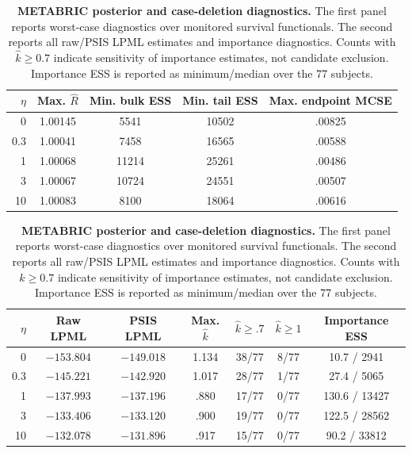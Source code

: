 \documentclass{article} %
\begin{document}
\begin{table}[htbp]
\centering\footnotesize
\caption{\textbf{METABRIC posterior and case-deletion diagnostics.} The first panel reports worst-case diagnostics over monitored survival functionals. The second reports all raw/PSIS LPML estimates and importance diagnostics. Counts with $\widehat k\geq0.7$ indicate sensitivity of importance estimates, not candidate exclusion. Importance ESS is reported as minimum/median over the 77 subjects.}
\label{tab:real-cpo-diagnostics}
\setlength{\tabcolsep}{5pt}
\begin{tabular}{@{}rcccc@{}}
\toprule
$\eta$ & Max. $\widehat R$ & Min. bulk ESS & Min. tail ESS & Max. endpoint MCSE\\
\midrule
0 & 1.00145 & 5541 & 10502 & .00825\\
0.3 & 1.00041 & 7458 & 16565 & .00588\\
1 & 1.00068 & 11214 & 25261 & .00486\\
3 & 1.00067 & 10724 & 24551 & .00507\\
10 & 1.00083 & 8100 & 18064 & .00616\\
\bottomrule
\end{tabular}
\par\medskip
\begin{tabular}{@{}rcccccc@{}}
\toprule
$\eta$ & Raw LPML & PSIS LPML & Max. $\widehat k$ & $\widehat k\geq.7$ & $\widehat k\geq1$ & Importance ESS\\
\midrule
0 & $-153.804$ & $-149.018$ & 1.134 & 38/77 & 8/77 & 10.7 / 2941\\
0.3 & $-145.221$ & $-142.920$ & 1.017 & 28/77 & 1/77 & 27.4 / 5065\\
1 & $-137.993$ & $-137.196$ & .880 & 17/77 & 0/77 & 130.6 / 13427\\
3 & $-133.406$ & $-133.120$ & .900 & 19/77 & 0/77 & 122.5 / 28562\\
10 & $-132.078$ & $-131.896$ & .917 & 15/77 & 0/77 & 90.2 / 33812\\
\bottomrule
\end{tabular}
\end{table}
\end{document}
